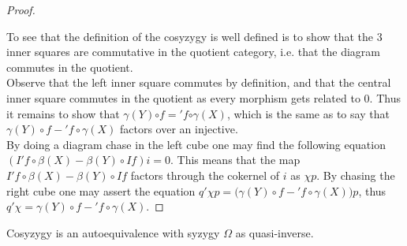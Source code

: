 \begin{proof}
\begin{center}
        \end{center}
        To see that the definition of the cosyzygy is well defined is to show that the 3 inner squares are commutative in the quotient category, i.e. that the diagram commutes in the quotient. \\
        
        Observe that the left inner square commutes by definition, and that the central inner square commutes in the quotient as every morphism gets related to $0$. Thus it remains to show that \underline{$\gamma (Y)$}$\circ$\underline{$f$}$=$\underline{$'f$}$\circ$\underline{$\gamma (X)$}, which is the same as to say that $\gamma (Y)\circ$$f-$$'f\circ\gamma (X)$ factors over an injective. \\
 
        By doing a diagram chase in the left cube one may find the following equation $(I'f\circ \beta(X)-\beta (Y)\circ If)i=0$. This means that the map $I'f\circ \beta(X)-\beta (Y)\circ If$ factors through the cokernel of $i$ as $\chi p$. By chasing the right cube one may assert the equation $q'\chi p = (\gamma (Y)\circ$$f-$$'f\circ\gamma (X))p$, thus $q'\chi =$$\gamma (Y)\circ$$f-$$'f\circ\gamma (X)$.
    \end{proof}

    \begin{corollary}
        Cosyzygy \upside{$\Omega$} is an autoequivalence with syzygy $\Omega$ as quasi-inverse.
    \end{corollary}

